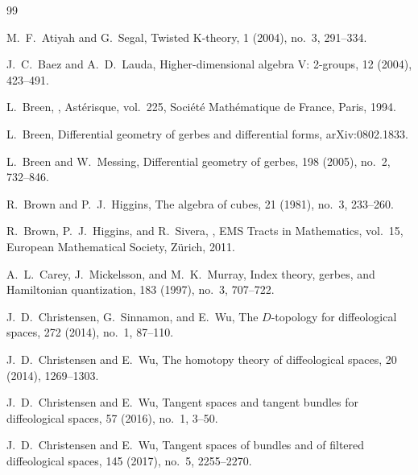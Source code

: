 \documentclass[11pt]{amsart}
\begin{document}
\begin{thebibliography}{99}

M.~F.~Atiyah and G.~Segal,
\newblock Twisted K-theory,
 1 (2004), no.~3, 291--334.




J.~C.~Baez and A.~D.~Lauda,
\newblock Higher-dimensional algebra V: 2-groups,
 12 (2004), 423--491.

L.~Breen,
,
\newblock Ast\'erisque, vol.~225,
\newblock Soci\'et\'e Math\'ematique de France, Paris, 1994.

L.~Breen,
\newblock Differential geometry of gerbes and differential forms,
\newblock arXiv:0802.1833.

L.~Breen and W.~Messing,
\newblock Differential geometry of gerbes,
 198 (2005), no.~2, 732--846.

R.~Brown and P.~J.~Higgins,
\newblock The algebra of cubes,
 21 (1981), no.~3, 233--260.

R.~Brown, P.~J.~Higgins, and R.~Sivera,
,
\newblock EMS Tracts in Mathematics, vol.~15,
\newblock European Mathematical Society, Z\"urich, 2011.

A.~L.~Carey, J.~Mickelsson, and M.~K.~Murray,
\newblock Index theory, gerbes, and Hamiltonian quantization,
 183 (1997), no.~3, 707--722.

J.~D.~Christensen, G.~Sinnamon, and E.~Wu,
\newblock The $D$-topology for diffeological spaces,
 272 (2014), no.~1, 87--110.

J.~D.~Christensen and E.~Wu,
\newblock The homotopy theory of diffeological spaces,
 20 (2014), 1269--1303.

J.~D.~Christensen and E.~Wu,
\newblock Tangent spaces and tangent bundles for diffeological spaces,
 57 (2016), no.~1, 3--50.

J.~D.~Christensen and E.~Wu,
\newblock Tangent spaces of bundles and of filtered diffeological spaces,
 145 (2017), no.~5, 2255--2270.


\end{thebibliography}
\end{document}
